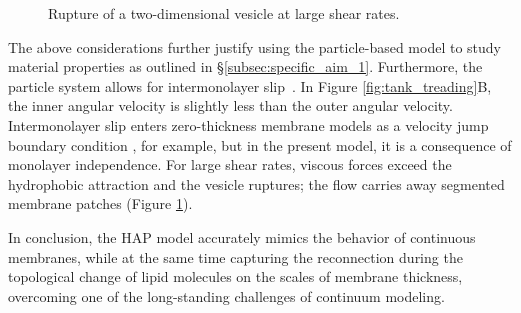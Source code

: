 \begin{figure}
  \caption{\label{fig:flow_rupture} \footnotesize Rupture of a
  two-dimensional vesicle at large shear rates.}
\end{figure}
The above considerations further justify using the particle-based model
to study material properties as outlined in
\S\ref{subsec:specific_aim_1}. Furthermore, the particle system allows
for intermonolayer slip~\cite{SHKULIPA2005823, ShkulipaThesis}. In
Figure \ref{fig:tank_treading}B, the inner angular velocity is slightly
less than the outer angular velocity. Intermonolayer slip enters
zero-thickness membrane models as a velocity jump boundary condition
\cite{schwalbe_vlahovska_miksis_2010}, for example, but in the present
model, it is a consequence of monolayer independence. For large shear
rates, viscous forces exceed the hydrophobic attraction and the vesicle
ruptures; the flow carries away segmented membrane patches (Figure
\ref{fig:flow_rupture}). 

In conclusion, the HAP model accurately mimics the behavior of continuous
membranes, while at the same time capturing the
reconnection during the topological change of 
lipid molecules on the scales of membrane thickness,
overcoming one of the long-standing challenges of continuum modeling.


